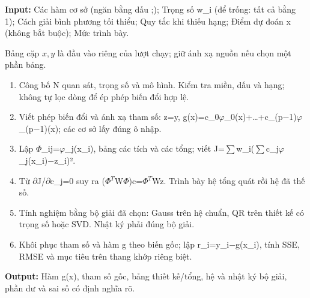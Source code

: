 \textbf{Input:} Các hàm cơ sở (\allowbreak{}ngăn bằng dấu ;\allowbreak{});\allowbreak{} Trọng số w\_i (\allowbreak{}để trống: tất cả bằng 1);\allowbreak{} Cách giải bình phương tối thiểu;\allowbreak{} Quy tắc khi thiếu hạng;\allowbreak{} Điểm dự đoán x (\allowbreak{}không bắt buộc);\allowbreak{} Mức trình bày.

Bảng cặp $x,y$ là đầu vào riêng của lượt chạy; giữ ánh xạ nguồn nếu chọn một phần bảng.

\begin{enumerate}

\item Công bố N quan sát,\allowbreak{} trọng số và mô hình. Kiểm tra miền,\allowbreak{} dấu và hạng;\allowbreak{} không tự lọc dòng để ép phép biến đổi hợp lệ.

\item Viết phép biến đổi và ánh xạ tham số: z=\allowbreak{}y,\allowbreak{} g(\allowbreak{}x)=\allowbreak{}c\_0\ensuremath{\varphi}\_0(\allowbreak{}x)+\allowbreak{}…+\allowbreak{}c\_(\allowbreak{}p\ensuremath{-}1)\ensuremath{\varphi}\_(\allowbreak{}p\ensuremath{-}1)(\allowbreak{}x);\allowbreak{} các cơ sở lấy đúng ô nhập.

\item Lập \ensuremath{\Phi}\_ij=\allowbreak{}\ensuremath{\varphi}\_j(\allowbreak{}x\_i),\allowbreak{} bảng các tích và các tổng;\allowbreak{} viết J=\allowbreak{}\ensuremath{\sum}w\_i(\allowbreak{}\ensuremath{\sum}c\_j\ensuremath{\varphi}\_j(\allowbreak{}x\_i)\ensuremath{-}z\_i)².

\item Từ \ensuremath{\partial}J/\allowbreak{}\ensuremath{\partial}c\_j=\allowbreak{}0 suy ra (\allowbreak{}\ensuremath{\Phi}\ensuremath{{}^T}W\ensuremath{\Phi})c=\allowbreak{}\ensuremath{\Phi}\ensuremath{{}^T}Wz. Trình bày hệ tổng quát rồi hệ đã thế số.

\item Tính nghiệm bằng bộ giải đã chọn: Gauss trên hệ chuẩn,\allowbreak{} QR trên thiết kế có trọng số hoặc SVD. Nhật ký phải đúng bộ giải.

\item Khôi phục tham số và hàm g theo biến gốc;\allowbreak{} lập r\_i=\allowbreak{}y\_i\ensuremath{-}g(\allowbreak{}x\_i),\allowbreak{} tính SSE,\allowbreak{} RMSE và mục tiêu trên thang khớp riêng biệt.

\end{enumerate}

\textbf{Output:} Hàm g(\allowbreak{}x),\allowbreak{} tham số gốc,\allowbreak{} bảng thiết kế/\allowbreak{}tổng,\allowbreak{} hệ và nhật ký bộ giải,\allowbreak{} phần dư và sai số có định nghĩa rõ.

